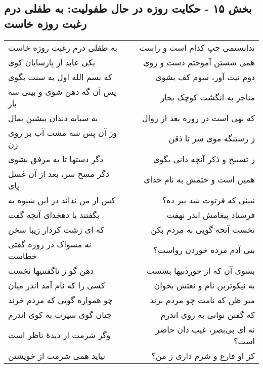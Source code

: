 \begin{center}
\section*{بخش ۱۵ - حکایت روزه در حال طفولیت: به طفلی درم رغبت روزه خاست}
\label{sec:015}
\begin{longtable}{l p{0.5cm} r}
به طفلی درم رغبت روزه خاست
&&
ندانستمی چپ کدام است و راست
\\
یکی عابد از پارسایان کوی
&&
همی شستن آموختم دست و روی
\\
که بسم الله اول به سنت بگوی
&&
دوم نیت آور، سوم کف بشوی
\\
پس آن گه دهن شوی و بینی سه بار
&&
مناخر به انگشت کوچک بخار
\\
به سبابه دندان پیشین بمال
&&
که نهی است در روزه بعد از زوال
\\
وز آن پس سه مشت آب بر روی زن
&&
ز رستنگه موی سر تا ذقن
\\
دگر دستها تا به مرفق بشوی
&&
ز تسبیح و ذکر آنچه دانی بگوی
\\
دگر مسح سر، بعد از آن غسل پای
&&
همین است و ختمش به نام خدای
\\
کس از من نداند در این شیوه به
&&
نبینی که فرتوت شد پیر ده؟
\\
بگفتند با دهخدای آنچه گفت
&&
فرستاد پیغامش اندر نهفت
\\
که ای زشت کردار زیبا سخن
&&
نخست آنچه گویی به مردم بکن
\\
نه مسواک در روزه گفتی خطاست
&&
بنی آدم مرده خوردن رواست؟
\\
دهن گو ز ناگفتنیها نخست
&&
بشوی آن که از خوردنیها بشست
\\
کسی را که نام آمد اندر میان
&&
به نیکوترین نام و نعتش بخوان
\\
چو همواره گویی که مردم خرند
&&
مبر ظن که نامت چو مردم برند
\\
چنان گوی سیرت به کوی اندرم
&&
که گفتن توانی به روی اندرم
\\
وگر شرمت از دیدهٔ ناظر است
&&
نه ای بی‌بصر، غیب دان حاضر است؟
\\
نیاید همی شرمت از خویشتن
&&
کز او فارغ و شرم داری ز من؟
\\
\end{longtable}
\end{center}
